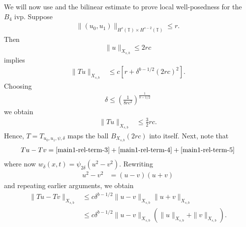 \documentclass[12pt,reqno]{amsart}
\numberwithin{equation}{section}  %
\renewcommand{\cref}{\Cref}
\newcommand{\ci}{\mathbb{T}}
\begin{document}
%
We will now use \cref{prop:contraction} and the bilinear estimate
to prove local well-posedness for the 
$B_4$ ivp. Suppose
%
\begin{equation*}
	\begin{split}
    \|(u_0, u_{1})\|_{H^s(\ci) \times H^{s-2}(\ci)} \le r.
  \end{split}
\end{equation*}
%
Then $$\|u\|_{X_{s,b}} \le 2rc$$ implies
%
\begin{equation*}
	\begin{split}
		\|Tu \|_{X_{s,b}} 
    & \le c \left[ r + \delta^{b - 1/2} \left( 
		2rc \right)^2 \right].
	\end{split}
\end{equation*}
%
Choosing 
%
%
\begin{equation}
  \label{delta-suf-small}
\begin{split}
  \delta \le \left (\frac{1}{8rc^{2}} \right )^{\frac{1}{b - 1/2}}
\end{split}
\end{equation}
%
%
we obtain 
%
%
%
\begin{equation*}
\begin{split}
\|Tu \|_{X_{s,b}} 
    & \le \frac{3}{2}rc.
  \end{split}
\end{equation*}
%
%
Hence, $T=T_{u_0, u_1, \psi, \delta}$ maps the ball $B_{X_{s,b}}(2rc)$ into
itself. Next, note that 
%
\begin{equation*}
	\begin{split}
    Tu - Tv = \eqref{main1-rel-term-3} + \eqref{main1-rel-term-4} +
    \eqref{main1-rel-term-5} 
  \end{split}
  \label{eqn:integral-form-dif}
\end{equation*}
%
where now $w_{\delta}(x,t) =\psi_{2 \delta}(u^{2} - v^{2})$. Rewriting
%
\begin{equation*}
	\begin{split}
	u^2 - v^2
		& = (u-v)(u+v)
		\end{split}
\end{equation*}
%
and repeating earlier arguments, we obtain
%
\begin{equation}
	\label{20a}
	\begin{split}
		\|Tu - Tv \|_{X_{s,b}}  
    & \le c \delta^{b - 1/2}\|u -v\|_{X_{s,b}} \|u + v \|_{X_{s,b}}
		\\
    & \le c \delta^{b -1/2} \|u -v\|_{X_{s,b}} (\|u\|_{X_{s,b}}+ \|v \|_{X_{s,b}}).
	\end{split}
\end{equation}
\end{document}
